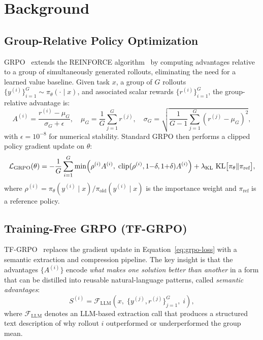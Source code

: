 \section{Background}

\label{sec:background}

\subsection{Group-Relative Policy Optimization}

GRPO~\cite{shao2024deepseekmath} extends the REINFORCE
algorithm~\cite{williams1992simple} by computing advantages relative to a
group of simultaneously generated rollouts, eliminating the need for a learned
value baseline. Given task $x$, a group of $G$ rollouts
$\{y^{(i)}\}_{i=1}^G \sim \pi_\theta(\cdot \mid x)$, and associated scalar
rewards $\{r^{(i)}\}_{i=1}^G$, the group-relative advantage is:
\begin{equation}
    A^{(i)} = \frac{r^{(i)} - \mu_G}{\sigma_G + \epsilon},
    \quad \mu_G = \frac{1}{G}\sum_{j=1}^G r^{(j)},
    \quad \sigma_G = \sqrt{\frac{1}{G-1}\sum_{j=1}^G (r^{(j)} - \mu_G)^2},
    \label{eq:grpo-advantage}
\end{equation}
with $\epsilon = 10^{-8}$ for numerical stability. Standard GRPO then performs
a clipped policy gradient update on $\theta$:
\begin{equation}
    \mathcal{L}_{\text{GRPO}}(\theta) = -\frac{1}{G}\sum_{i=1}^G \min\!\left(
        \rho^{(i)} A^{(i)},\; \text{clip}(\rho^{(i)}, 1{-}\delta, 1{+}\delta) A^{(i)}
    \right) + \lambda_{\text{KL}}\,\operatorname{KL}\bigl[\pi_\theta \| \pi_{\text{ref}}\bigr],
    \label{eq:grpo-loss}
\end{equation}
where $\rho^{(i)} = \pi_\theta(y^{(i)} \mid x) / \pi_{\text{old}}(y^{(i)} \mid x)$
is the importance weight and $\pi_{\text{ref}}$ is a reference policy.

\subsection{Training-Free GRPO (TF-GRPO)}

TF-GRPO~\cite{hanzo2026aso} replaces the gradient update in
Equation~\eqref{eq:grpo-loss} with a semantic extraction and compression
pipeline. The key insight is that the advantages $\{A^{(i)}\}$ encode
\emph{what makes one solution better than another} in a form that can be
distilled into reusable natural-language patterns, called \emph{semantic
advantages}:
\begin{equation}
    S^{(i)} = \mathcal{F}_{\text{LLM}}\!\left(x,\;\{y^{(j)}, r^{(j)}\}_{j=1}^G,\; i\right),
    \label{eq:semantic-advantage}
\end{equation}
where $\mathcal{F}_{\text{LLM}}$ denotes an LLM-based extraction call that
produces a structured text description of why rollout $i$ outperformed or
underperformed the group mean.

